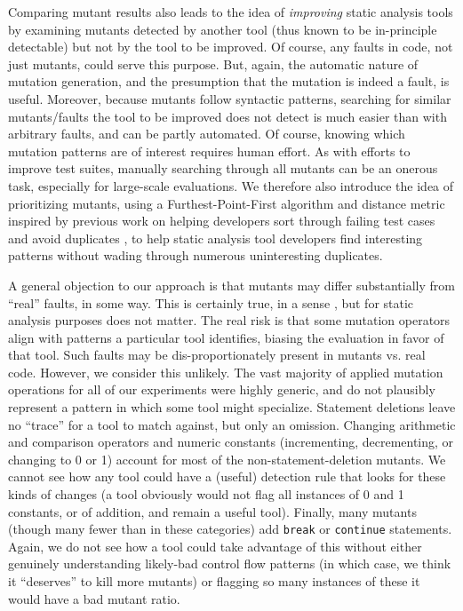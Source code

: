 Comparing mutant results also leads to the idea of \emph{improving} static analysis tools by examining mutants detected by another tool (thus known to be in-principle detectable) but not by the tool to be improved.  Of course, any faults in code, not just mutants, could serve this purpose.  But, again, the automatic nature of mutation generation, and the presumption that the mutation is indeed a fault, is useful.  Moreover, because mutants follow syntactic patterns, searching for similar mutants/faults the tool to be improved does not detect is much easier than with arbitrary faults, and can be partly automated.  Of course, knowing which mutation patterns are of interest requires human effort.  As with efforts to improve test suites, manually searching through all mutants can be an onerous task, especially for large-scale evaluations.  We therefore also introduce the idea of prioritizing mutants, using a Furthest-Point-First \cite{Gonzalez} algorithm and distance metric inspired by previous work on helping developers sort through failing test cases and avoid duplicates \cite{PLDI13}, to help static analysis tool developers find interesting patterns without wading through numerous uninteresting duplicates.

A general objection to our approach is that mutants may differ substantially from ``real'' faults, in some way.  This is certainly true, in a sense \cite{GopinathMutants}, but for static analysis purposes does not matter.   The real risk is that some mutation operators align with patterns a particular tool identifies, biasing the evaluation in favor of that tool.  Such faults may be dis-proportionately present in mutants vs. real code.  However, we consider this unlikely.  The vast majority of applied mutation operations for all of our experiments were highly generic, and do not plausibly represent a pattern in which some tool might specialize.  Statement deletions leave no ``trace'' for a tool to match against, but only an omission.  Changing arithmetic and comparison operators and numeric constants (incrementing, decrementing, or changing to 0 or 1) account for most of the non-statement-deletion mutants.  We cannot see how any tool could have a (useful) detection rule that looks for these kinds of changes (a tool obviously would not flag all instances of 0 and 1 constants, or of addition, and remain a useful tool).  Finally, many mutants (though many fewer than in these categories) add {\tt break} or {\tt continue} statements.  Again, we do not see how a tool could take advantage of this without either genuinely understanding likely-bad control flow patterns (in which case, we think it ``deserves'' to kill more mutants) or flagging so many instances of these it would have a bad mutant ratio. 

